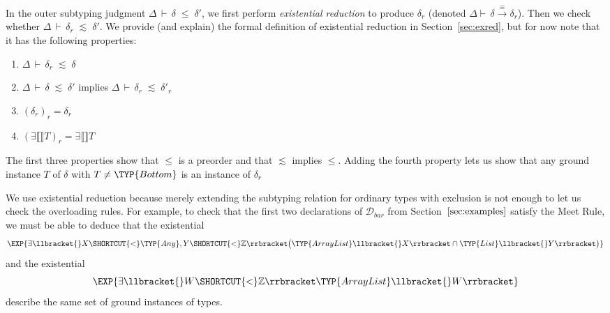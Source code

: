 \documentclass[10pt]{sigplanconf}
\newcommand{\leinner}{\ensuremath{\lesssim}}
\newcommand{\ob}[1]{\ensuremath{\llbracket {#1} \rrbracket}}
\newcommand{\D}{\ensuremath{\mathcal{D}}}
\newcommand{\exttype}[2][\Delta]{\ensuremath{\exists\ob{#1}{#2}}}
\newcommand{\reduce}[1]{\ensuremath{{#1}_r}}
\newcommand{\Bottom}{\TYP{Bottom}}
\newcommand{\eqred}{\overset{\equiv}{\longrightarrow}}
\newcommand{\jgtemplate}[4][\Delta]{\ensuremath{{#1}\,\vdash\,{#2}\;{#3}\;{#4}}}
\newcommand{\jle}[3][\Delta]{\jgtemplate[#1]{#2}{\le}{#3}}
\newcommand{\jleinner}[3][\Delta]{\jgtemplate[#1]{#2}{\leinner}{#3}}
\newcommand{\jtred}[2]{\ensuremath{\Delta \vdash\,{#1} \eqred {#2}}}
\begin{document}
In the outer subtyping judgment $\jle{\delta}{\delta'}$, 
we first perform \emph{existential reduction} to produce $\reduce{\delta}$ 
(denoted \jtred{\delta}{\reduce{\delta}}). 
Then we check whether $\jleinner{\reduce{\delta}}{\delta'}$.
We provide (and explain) the formal definition of existential reduction in Section~\ref{sec:exred}, but for now note that it has the following properties:
\begin{enumerate}
\item $\jleinner{\reduce{\delta}}{\delta}$
\item $\jleinner{\delta}{\delta'}$ implies $\jleinner{\reduce{\delta}}{\reduce{\delta'}}$
\item $\reduce{(\reduce{\delta})} = \reduce{\delta}$
\item $\reduce{(\exttype[]{T})} = \exttype[]{T}$
\end{enumerate}
The first three properties show that $\le$ is a preorder and that $\leinner$ implies $\le$.
Adding the fourth property lets us show that any ground instance $T$ of $\delta$ with $T \neq \Bottom$ is an instance of $\reduce{\delta}$

We use existential reduction 
because merely extending the subtyping relation for ordinary types with exclusion
is not enough to let us check the overloading rules. For example, to check that the first two declarations of $\D_{\mathit{bar}}$ from Section~$\ref{sec:examples}$ satisfy the Meet Rule,
we must be able to deduce that the existential
\[\EXP{\exists\llbracket{}X \SHORTCUT{<} \TYP{Any}, Y \SHORTCUT{<} \mathbb{Z}\rrbracket\bigl(\TYP{ArrayList}\llbracket{}X\rrbracket \cap \TYP{List}\llbracket{}Y\rrbracket\bigr)}\]
and the existential
\[\EXP{\exists\llbracket{}W\SHORTCUT{<}\mathbb{Z}\rrbracket\TYP{ArrayList}\llbracket{}W\rrbracket}\]
describe the same set of ground instances of types.
\end{document}
